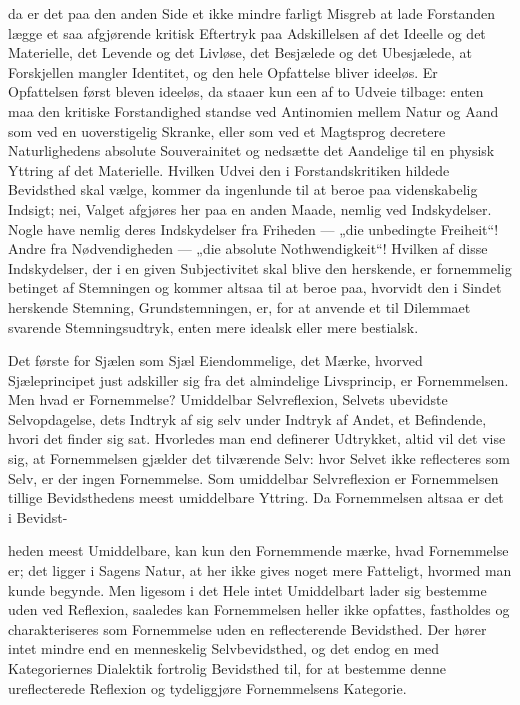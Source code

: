 \documentclass[12pt,a4paper]{book}
\begin{document}
da er det paa den anden Side et ikke mindre farligt Misgreb at lade Forstanden
lægge et saa afgjørende kritisk Eftertryk paa Adskillelsen af det Ideelle og
det Materielle, det Levende og det Livløse, det Besjælede og det Ubesjælede, at
Forskjellen mangler Identitet, og den hele Opfattelse bliver ideeløs. Er
Opfattelsen først bleven ideeløs, da staaer kun een af to Udveie tilbage: enten
maa den kritiske Forstandighed standse ved Antinomien mellem Natur og Aand som
ved en uoverstigelig Skranke, eller som ved et Magtsprog decretere
Naturlighedens absolute Souverainitet og nedsætte det Aandelige til en physisk
Yttring af det Materielle. Hvilken Udvei den i Forstandskritiken hildede
Bevidsthed skal vælge, kommer da ingenlunde til at beroe paa videnskabelig
Indsigt; nei, Valget afgjøres her paa en anden Maade, nemlig ved Indskydelser.
Nogle have nemlig deres Indskydelser fra Friheden --- „die unbedingte
Freiheit“! Andre fra Nødvendigheden --- „die absolute Nothwendigkeit“! Hvilken
af disse Indskydelser, der i en given Subjectivitet skal blive den herskende,
er fornemmelig betinget af Stemningen og kommer altsaa til at beroe paa,
hvorvidt den i Sindet herskende Stemning, Grundstemningen, er, for at anvende
et til Dilemmaet svarende Stemningsudtryk, enten mere idealsk eller mere
bestialsk.

Det første for Sjælen som Sjæl Eiendommelige, det Mærke, hvorved Sjæleprincipet
just adskiller sig fra det almindelige Livsprincip, er Fornemmelsen. Men hvad
er Fornemmelse? Umiddelbar Selvreflexion, Selvets ubevidste Selvopdagelse, dets
Indtryk af sig selv under Indtryk af Andet, et Befindende, hvori det finder sig
sat. Hvorledes man end definerer Udtrykket, altid vil det vise sig, at
Fornemmelsen gjælder det tilværende Selv: hvor Selvet ikke reflecteres som
Selv, er der ingen Fornemmelse. Som umiddelbar Selvreflexion er Fornemmelsen
tillige Bevidsthedens meest umiddelbare Yttring. Da Fornemmelsen altsaa er det
i Bevidst-

\setcounter{footnote}{0}
heden meest Umiddelbare, kan kun den Fornemmende mærke, hvad Fornemmelse er;
det ligger i Sagens Natur, at her ikke gives noget mere Fatteligt, hvormed man
kunde begynde. Men ligesom i det Hele intet Umiddelbart lader sig bestemme uden
ved Reflexion, saaledes kan Fornemmelsen heller ikke opfattes, fastholdes og
charakteriseres som Fornemmelse uden en reflecterende Bevidsthed. Der hører
intet mindre end en menneskelig Selvbevidsthed, og det endog en med
Kategoriernes Dialektik fortrolig Bevidsthed til, for at bestemme denne
ureflecterede Reflexion og tydeliggjøre Fornemmelsens Kategorie.
\end{document}
